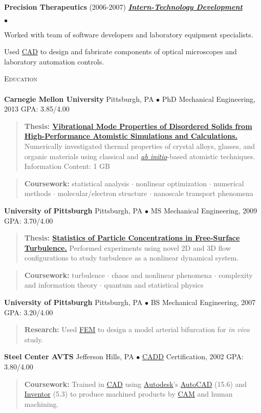 \documentclass{article}
\newcommand{\area}[2]{\vspace*{-9pt} \begin{verse}\textbf{#1}   #2 \end{verse}  }
\newcommand{\lineunder}{\vspace*{-8pt} \\ \hspace*{-18pt} \hrulefill \\}
\newcommand{\header}[1]{{\hspace*{-15pt}\vspace*{6pt} \textsc{#1}} \vspace*{-6pt} \lineunder}
\newcommand{\employer}[3]{{ \textbf{#1} (#2) \underline{\textbf{\emph{#3}}}\\  }}
\newenvironment{achievements}{\begin{list}{$\bullet$}{\topsep 0pt \itemsep -2pt}}{\vspace*{4pt}\end{list}}
\newcommand{\schoolwithcourses}[3]{
 \textbf{#1} #2 $\bullet$ #3\\ 
\vspace*{5pt}
}
\begin{document}
\employer{Precision Therapeutics}{2006-2007}{Intern-Technology Development}
	\begin{achievements}
	\item Worked with team of software developers and laboratory equipment specialists.
	\item Used \href{http://en.wikipedia.org/wiki/Computer-aided_design}{CAD} to design and fabricate components of optical microscopes and laboratory automation controls. 
	\end{achievements}

\header{Education}

\schoolwithcourses{Carnegie Mellon University}{Pittsburgh, PA}{PhD Mechanical Engineering, 2013 GPA: 3.85/4.00}

\area{
Thesis: \href{http://jasonlarkin.github.io/projects-phd.html}
{Vibrational Mode Properties of Disordered
Solids from High-Performance Atomistic
Simulations and Calculations.}}
{Numerically investigated thermal properties of crystal alloys, glasses, and organic materials using classical and \href{http://en.wikipedia.org/wiki/Ab_initio_quantum_chemistry_methods}{\emph{ab initio}}-based atomistic techniques. Information Content: 1 GB} 

\area{Coursework:}
{
statistical analysis $\cdot$ nonlinear optimization $\cdot$ numerical methods $\cdot$ molecular/electron structure $\cdot$ nanoscale transport phenomena  
}

\schoolwithcourses{University of Pittsburgh}{Pittsburgh, PA}{MS Mechanical Engineering, 2009 GPA: 3.70/4.00}

\area{
Thesis: \href{http://jasonlarkin.github.io/projects-ms.html}
{Statistics of Particle Concentrations in Free-Surface Turbulence.}}
{Performed experiments using novel 2D and 3D flow configurations to study turbulence 
as a nonlinear dynamical system.}

\area{Coursework:}
{
turbulence $\cdot$ chaos and nonlinear phenomena $\cdot$ complexity and information theory $\cdot$ quantum and statistical physics 
}

\schoolwithcourses{University of Pittsburgh}{Pittsburgh, PA}{BS Mechanical Engineering, 2007 GPA: 3.20/4.00}

\area{
Research: }
{Used \href{http://en.wikipedia.org/wiki/Finite_element_method}{FEM} to design a model arterial bifurcation for \emph{in vivo} study.}

\schoolwithcourses{Steel Center AVTS}{Jefferson Hills, PA}{\href{http://en.wikipedia.org/wiki/Computer-aided_design}{CADD} Certification, 2002 GPA: 3.80/4.00}
\area{
Coursework: }
{Trained in \href{http://en.wikipedia.org/wiki/Computer-aided_design}{CAD} using \href{http://www.autodesk.com/}{Autodesk}'s \href{http://www.autodesk.com/products/autocad/overview}{AutoCAD} (15.6) and \href{http://www.autodesk.com/products/autodesk-inventor-family/overview}{Inventor} (5.3) 
to produce machined products by \href{http://en.wikipedia.org/wiki/Computer-aided_manufacturing}{CAM} and human machining.  }
\end{document}
